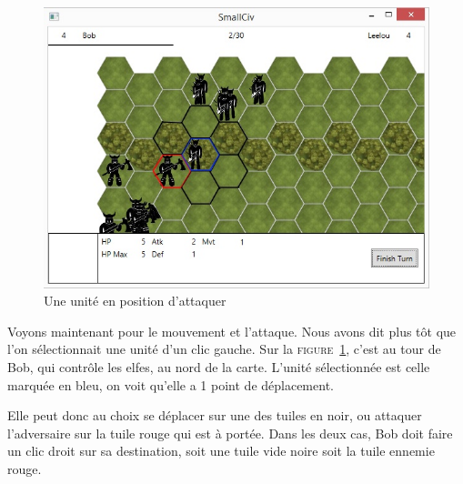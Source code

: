 \begin{figure}[h]
	\centering
	\includegraphics{img/mvt_atk.jpg}
	\caption{Une unité en position d'attaquer}
	\label{mvt_atk}
\end{figure}
Voyons maintenant pour le mouvement et l'attaque. Nous avons dit plus tôt que l'on sélectionnait une unité d'un clic gauche. Sur la \textsc{figure~\ref{mvt_atk}}, c'est au tour de Bob, qui contrôle les elfes, au nord de la carte. L'unité sélectionnée est celle marquée en bleu, on voit qu'elle a 1 point de déplacement.\newline

Elle peut donc au choix se déplacer sur une des tuiles en noir, ou attaquer l'adversaire sur la tuile rouge qui est à portée. Dans les deux cas, Bob doit faire un clic droit sur sa destination, soit une tuile vide noire soit la tuile ennemie rouge.\newline

